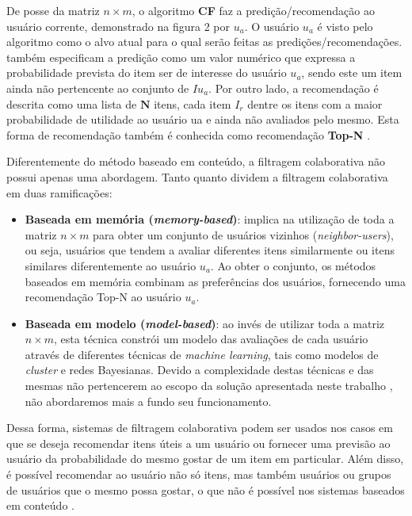 \documentclass[12pt, openright, oneside, a4paper, brazil]{abntex2}
\begin{document}
De posse da matriz $n \times m$, o algoritmo \textbf{CF} faz a predição/recomendação ao usuário corrente, demonstrado na figura 2 por $u_{a}$. O usuário $u_{a}$ é visto pelo algoritmo como o alvo atual para o qual serão feitas as predições/recomendações.  também especificam a predição como um valor numérico que expressa a probabilidade prevista do item ser de interesse do usuário $u_{a}$, sendo este um item ainda não pertencente ao conjunto de $Iu_{a}$. Por outro lado, a recomendação é descrita como uma lista de $\textbf{N}$ itens, cada item $I_{r}$ dentre os itens com a maior probabilidade de utilidade ao usuário ua e ainda não avaliados pelo mesmo. Esta forma de recomendação também é conhecida como recomendação \textbf{Top-N} \cite{adomavicius2005toward}.

Diferentemente do método baseado em conteúdo, a filtragem colaborativa não possui apenas uma abordagem.     Tanto  quanto  dividem a filtragem colaborativa em duas ramificações:

\begin{itemize}

	\item \textbf{Baseada em memória (\textit{memory-based})}: implica na utilização de toda a matriz $n \times m$ para obter um conjunto de usuários vizinhos (\textit{neighbor-users}), ou seja, usuários que tendem a avaliar diferentes itens similarmente ou itens similares diferentemente ao usuário $u_{a}$. Ao obter o conjunto, os métodos baseados em memória combinam as preferências dos usuários, fornecendo uma recomendação Top-N ao usuário $u_{a}$.

	\item \textbf{Baseada em modelo (\textit{model-based})}: ao invés de utilizar toda a matriz $n \times m$, esta técnica constrói um modelo das avaliações de cada usuário através de diferentes técnicas de \textit{machine learning}, tais como modelos de \textit{cluster} e redes Bayesianas. Devido a complexidade destas técnicas e das mesmas não pertencerem ao escopo da solução apresentada neste trabalho , não abordaremos mais a fundo seu funcionamento.

\end{itemize}

Dessa forma, sistemas de filtragem colaborativa podem ser usados nos casos em que se deseja recomendar itens úteis a um usuário ou fornecer uma previsão ao usuário da probabilidade do mesmo gostar de um item em particular. Além disso, é possível recomendar ao usuário não só itens, mas também usuários ou grupos de usuários que o mesmo possa gostar, o que não é possível nos sistemas baseados em conteúdo \cite{schafer2007collaborative}.
\end{document}

